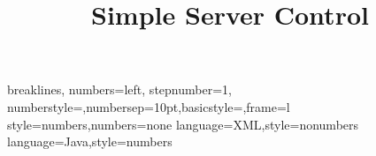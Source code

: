 \setlength{\parskip}{1ex plus 0.5ex minus 0.2ex}

\title{Simple Server Control}

\newcommand{\sscontrol}{\textit{Simple Server Control}}
\newcommand{\code}{\texttt}
\newcommand{\parameter}[1]{``\texttt{#1}'' Parameter}
\newcommand{\directive}[1]{``\texttt{#1}'' Direktive}
\newcommand{\variable}[1]{``\texttt{#1}'' Variable}

{breaklines, numbers=left, stepnumber=1,
numberstyle=\tiny,numbersep=10pt,basicstyle=\scriptsize\ttfamily,frame=l}
{style=numbers,numbers=none}
{language=XML,style=nonumbers}
{language=Java,style=numbers}
